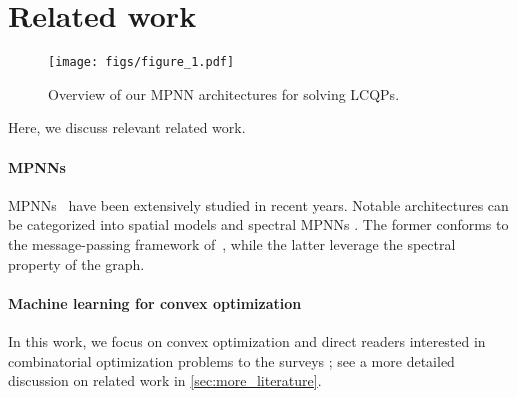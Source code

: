 \section{Related work}
\begin{figure*}
\begin{center}
\texttt{[image: figs/figure\_1.pdf]}
\end{center}
\vspace{-20pt}
\caption{Overview of our MPNN architectures for solving LCQPs.}
\end{figure*}

Here, we discuss relevant related work.

\paragraph{MPNNs} MPNNs~\citep{Gil+2017,Sca+2009} have been extensively studied in recent years. Notable architectures can be categorized into spatial models \citep{Duv+2015,Ham+2017,bresson2017residual,Vel+2018,xu2018how} and spectral MPNNs \citep{Bru+2014,defferrard2016convolutional,Kip+2017,Lev+2019,monti2018motifnet,geisler2024spatio}. The former conforms to the message-passing framework of~\citet{Gil+2017}, while the latter leverage the spectral property of the graph. 

\paragraph{Machine learning for convex optimization}
In this work, we focus on convex optimization and direct readers interested in combinatorial optimization problems to the surveys \citet{bengio2021machine,cappart2023combinatorial,peng2021graph}; see a more detailed discussion on related work in \cref{sec:more_literature}.

